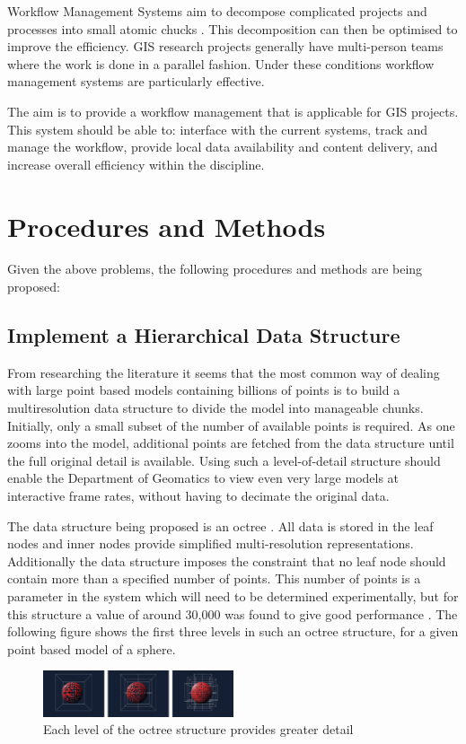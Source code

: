 \documentclass[12pt,a4paper]{article}
\begin{document}
Workflow Management Systems aim to decompose complicated projects and processes into
small atomic chucks \cite{Taylor:2006:WES:1196459}. This decomposition can then be
optimised to improve the efficiency.
GIS research projects generally have multi-person teams where the work is
done in a parallel fashion. Under these conditions workflow management systems
are particularly effective.

The aim is to provide a workflow management that is applicable for GIS projects.
This system should be able to: interface with the current systems, track and
manage the workflow, provide local data availability and content delivery, and
increase overall efficiency within the discipline.

\section{Procedures and Methods}
Given the above problems, the following procedures and methods are being proposed:
\subsection{Implement a Hierarchical Data Structure}
From researching the literature it seems that the most common way of dealing
with large point based models containing billions of points is to build a
multiresolution data structure to divide the model into manageable chunks.
Initially, only a small subset of the number of available points is required.
As one zooms into the model, additional points are fetched from the
data structure until the full original detail is available. Using such a
level-of-detail structure should enable the Department of Geomatics to
view even very large models at interactive frame rates, without having
to decimate the original data.

The data structure being proposed is an octree \cite{interactivepointclouds}. All
data is stored in the leaf nodes and inner nodes provide simplified multi-resolution
representations. Additionally the data structure imposes the constraint that no leaf
node should contain more than a specified number of points. This number of points is
a parameter in the system which will need to be determined experimentally, but for
this structure a value of around 30,000 was found to give good performance
\cite{interactivepointclouds}. The following figure shows the first three levels in such an octree structure, for a given point based model of a sphere.
\begin{figure}[h!]
\centering
    \includegraphics[width=0.5\textwidth]{oct.png}
    \caption{Each level of the octree structure provides greater detail}
\end{figure}
\end{document}
